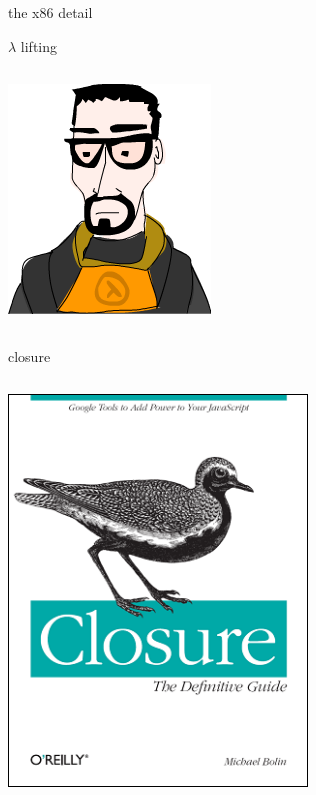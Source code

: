 \documentclass{beamer}
\begin{document}
\begin{frame}{the x86 detail}
  
  \vfill
  
\end{frame}

\begin{frame}{$\lambda$ lifting}
  \begin{columns}
    \begin{column}[b]{3.8cm}
      \includegraphics[scale=0.4]{lambda}
    \end{column}
    \begin{column}[b]{6.2cm}
      
      
    \end{column}
  \end{columns}
\end{frame}

\begin{frame}{closure}
  \begin{columns}
    \begin{column}[b]{3.8cm}
      \includegraphics[scale=0.3]{closure}
    \end{column}
    \begin{column}[b]{6.2cm}
      
    \end{column}
  \end{columns}
\end{frame}
\end{document}
